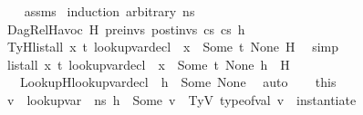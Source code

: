 \begin{isabellebody}
%
\isadelimproof
\ \ %
\endisadelimproof
%
\isatagproof
{}\isamarkupfalse%
\ assms\isanewline
{}\isamarkupfalse%
\ {\isacharparenleft}{\kern0pt}induction\ arbitrary{\isacharcolon}{\kern0pt}\ ns{}{\isacharparenright}{\kern0pt}\isanewline
\ \ \isamarkupfalse%
\ {\isacharparenleft}{\kern0pt}DagRel{\isacharunderscore}{\kern0pt}Havoc\ H\ pre{\isacharunderscore}{\kern0pt}invs\ post{\isacharunderscore}{\kern0pt}invs\ cs{}\ cs{}\ h{\isacharparenright}{\kern0pt}\ \ \isanewline
\ \ \isamarkupfalse%
\ TyH{\isacharcolon}{\kern0pt}{\isachardoublequoteopen}list{\isacharunderscore}{\kern0pt}all\ {\isacharparenleft}{\kern0pt}{\isasymlambda}x{\isachardot}{\kern0pt}\ {\isasymexists}t{\isachardot}{\kern0pt}\ lookup{\isacharunderscore}{\kern0pt}var{\isacharunderscore}{\kern0pt}decl\ {\isasymLambda}\ x\ {\isacharequal}{\kern0pt}\ Some\ {\isacharparenleft}{\kern0pt}t{\isacharcomma}{\kern0pt}\ None{\isacharparenright}{\kern0pt}{\isacharparenright}{\kern0pt}\ H{\isachardoublequoteclose}\ \isamarkupfalse%
\ simp\isanewline
\ \ \isamarkupfalse%
\ {\isacartoucheopen}list{\isacharunderscore}{\kern0pt}all\ {\isacharparenleft}{\kern0pt}{\isasymlambda}x{\isachardot}{\kern0pt}\ {\isasymexists}t{\isachardot}{\kern0pt}\ lookup{\isacharunderscore}{\kern0pt}var{\isacharunderscore}{\kern0pt}decl\ {\isasymLambda}\ x\ {\isacharequal}{\kern0pt}\ Some\ {\isacharparenleft}{\kern0pt}t{\isacharcomma}{\kern0pt}\ None{\isacharparenright}{\kern0pt}{\isacharparenright}{\kern0pt}\ {\isacharparenleft}{\kern0pt}h\ {\isacharhash}{\kern0pt}\ H{\isacharparenright}{\kern0pt}{\isacartoucheclose}\ \isamarkupfalse%
\ {\isasymtau}\ \ LookupH{\isacharcolon}{\kern0pt}{\isachardoublequoteopen}lookup{\isacharunderscore}{\kern0pt}var{\isacharunderscore}{\kern0pt}decl\ {\isasymLambda}\ h\ {\isacharequal}{\kern0pt}\ Some\ {\isacharparenleft}{\kern0pt}{\isasymtau}{\isacharcomma}{\kern0pt}None{\isacharparenright}{\kern0pt}{\isachardoublequoteclose}\ \isamarkupfalse%
\ auto\isanewline
\ \ \isamarkupfalse%
\ this\ \isamarkupfalse%
\ v\ \ {\isachardoublequoteopen}lookup{\isacharunderscore}{\kern0pt}var\ {\isasymLambda}\ ns{}\ h\ {\isacharequal}{\kern0pt}\ Some\ v{\isachardoublequoteclose}\ \ TyV{\isacharcolon}{\kern0pt}\ {\isachardoublequoteopen}type{\isacharunderscore}{\kern0pt}of{\isacharunderscore}{\kern0pt}val\ v\ {\isacharequal}{\kern0pt}\ instantiate\ {\isasymOmega}\ {\isasymtau}{\isachardoublequoteclose}\isanewline

\end{isabellebody}
